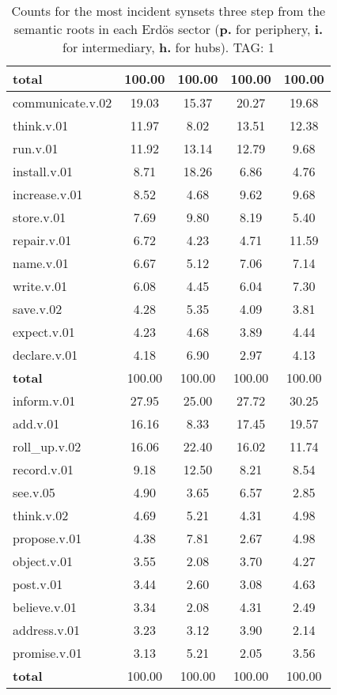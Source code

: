\begin{table}[h!]
\begin{center}
\begin{tabular}{| l || c | c | c | c |}
{{\bf total}} & 100.00  & 100.00  & 100.00  & 100.00 \\\hline\hline\hline
communicate.v.02 & 19.03  & 15.37  & 20.27  & 19.68 \\\hline
think.v.01 & 11.97  & 8.02  & 13.51  & 12.38 \\\hline
run.v.01 & 11.92  & 13.14  & 12.79  & 9.68 \\\hline
install.v.01 & 8.71  & 18.26  & 6.86  & 4.76 \\\hline
increase.v.01 & 8.52  & 4.68  & 9.62  & 9.68 \\\hline
store.v.01 & 7.69  & 9.80  & 8.19  & 5.40 \\\hline
repair.v.01 & 6.72  & 4.23  & 4.71  & 11.59 \\\hline
name.v.01 & 6.67  & 5.12  & 7.06  & 7.14 \\\hline
write.v.01 & 6.08  & 4.45  & 6.04  & 7.30 \\\hline
save.v.02 & 4.28  & 5.35  & 4.09  & 3.81 \\\hline
expect.v.01 & 4.23  & 4.68  & 3.89  & 4.44 \\\hline
declare.v.01 & 4.18  & 6.90  & 2.97  & 4.13 \\\hline\hline
{{\bf total}} & 100.00  & 100.00  & 100.00  & 100.00 \\\hline\hline\hline
inform.v.01 & 27.95  & 25.00  & 27.72  & 30.25 \\\hline
add.v.01 & 16.16  & 8.33  & 17.45  & 19.57 \\\hline
roll\_up.v.02 & 16.06  & 22.40  & 16.02  & 11.74 \\\hline
record.v.01 & 9.18  & 12.50  & 8.21  & 8.54 \\\hline
see.v.05 & 4.90  & 3.65  & 6.57  & 2.85 \\\hline
think.v.02 & 4.69  & 5.21  & 4.31  & 4.98 \\\hline
propose.v.01 & 4.38  & 7.81  & 2.67  & 4.98 \\\hline
object.v.01 & 3.55  & 2.08  & 3.70  & 4.27 \\\hline
post.v.01 & 3.44  & 2.60  & 3.08  & 4.63 \\\hline
believe.v.01 & 3.34  & 2.08  & 4.31  & 2.49 \\\hline
address.v.01 & 3.23  & 3.12  & 3.90  & 2.14 \\\hline
promise.v.01 & 3.13  & 5.21  & 2.05  & 3.56 \\\hline\hline
{{\bf total}} & 100.00  & 100.00  & 100.00  & 100.00 \\\hline
\end{tabular}
\caption{Counts for the most incident synsets three step from the semantic roots in each Erd\"os sector ({\bf p.} for periphery, {\bf i.} for intermediary, {\bf h.} for hubs). TAG: 1}
\end{center}
\end{table}